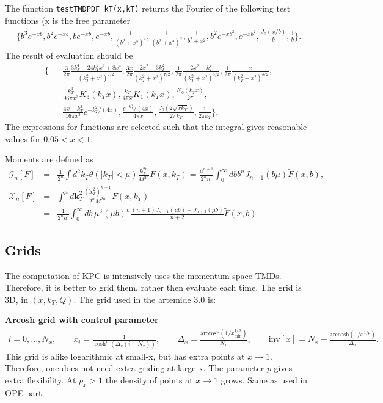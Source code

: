 \documentclass[prd,nofootinbib,eqsecnum,final]{revtex4}
\newcommand{\nn}{\nonumber}
\renewcommand{\(}{\left(}
\renewcommand{\)}{\right)}
\renewcommand{\[}{\left[}
\renewcommand{\]}{\right]}
\renewcommand{\vec}[1]{\bm{#1}}
\begin{document}
The function \texttt{testTMDPDF{\_}kT(x,kT)} returns the Fourier of the following test functions (x is the free parameter
\begin{eqnarray}
\{b^3 e^{-x b},b^2 e^{-x b},b e^{-x b},e^{-x b},\frac{1}{(b^2+x^{2})^4},\frac{1}{(b^2+x^{2})^2},\frac{1}{b^2+x^{2}},
b^2 e^{-x b^2},e^{-x b^2}, \frac{J_0(x/b)}{b},\frac{1}{b}\}.
\end{eqnarray}
The result of evaluation should be
\begin{eqnarray}
\Bigg\{&& \frac{3}{2\pi}\frac{3k_T^4-24 k_T^2 x^2+8x^4}{(k_T^2+x^2)^{9/2}},\frac{3x}{2\pi}\frac{2x^2-3k_T^2}{(k_T^2+x^2)^{7/2}},
\frac{1}{2\pi}\frac{2x^2-k_T^2}{(k_T^2+x^2)^{5/2}},\frac{1}{2\pi}\frac{x}{(k_T^2+x^2)^{3/2}},
\\\nn &&
\frac{k_T^3}{96\pi x^3}K_3\(k_Tx\),\frac{k_T }{4\pi x}K_1\(k_Tx \),\frac{K_0\(k_Tx\)}{2\pi},
\\\nn &&  \frac{4 x-k_T^2}{16\pi x^3}e^{-k_T^2/(4x)},\frac{e^{-k_T^2}/(4x)}{4\pi x},
\frac{J_0(2\sqrt{x k_T})}{2\pi k_T}, \frac{1}{2\pi k_T }\Bigg\}.
\end{eqnarray}
The expressions for functions are selected such that the integral gives reasonable values for $0.05<x<1$.

Moments are defined as
\begin{eqnarray}
\mathcal{G}_n[F]&=&\frac{1}{2^n}\int d^2k_T \theta(|k_T|<\mu) \frac{k_T^{2n}}{M^{2n}} F(x,k_T)
=
\frac{\mu^{n+1}}{2^nn!}
\int_0^\infty db b^{n}   J_{n+1}(b\mu)\widetilde{F}(x,b),
\\
\mathcal{X}_n[F]&=&\int^\mu d\vec k_T^2 \frac{(\vec k_T^2)^{n+1}}{2^nM^{2n}}F(x,k_T)
\\\nn &=&\frac{1}{2^nn!}\int_0^\infty db\,\mu^3(\mu b)^n \frac{(n+1)J_{n+1}(\mu b)-J_{n+3}(\mu b)}{n+2}\widetilde{F}(x,b).
\end{eqnarray}

\subsection{Grids}

The computation of KPC is intensively uses the momentum space TMDs. Therefore, it is better to grid them, rather then evaluate each time. The grid is 3D, in $(x,k_T,Q)$. The grid used in the artemide 3.0 is:

\textbf{Arcosh grid with control parameter}
\begin{eqnarray}\label{grid_KT:x-grid}
i=0,...,N_x,\qquad 
x_i=\frac{1}{\cosh^p\(\Delta_x(i-N_x)\)},\qquad \Delta_x=\frac{\text{arccosh}(1/x^{1/p}_{\text{min}})}{N_x},\qquad \text{inv}[x]=
N_x-\frac{\text{arccosh}(1/x^{1/p})}{\Delta_x}.
\end{eqnarray}
This grid is alike logarithmic at small-x, but has extra points at $x\to 1$. Therefore, one does not need extra griding at large-x. The parameter $p$ gives extra flexibility. At $p_x>1$ the density of points at $x\to 1$ grows. Same as used in OPE part.
\end{document}
